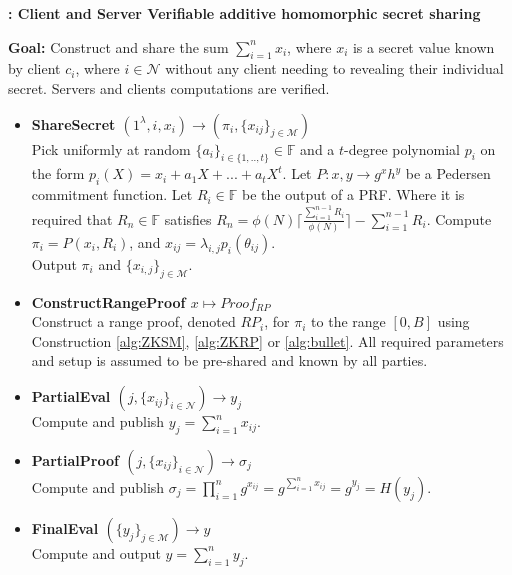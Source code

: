 \begin{algorithm}
\caption{\textbf{: Client and Server Verifiable additive homomorphic secret sharing}}

\textbf{Goal:} Construct and share the sum $\sum_{i=1}^n x_i$, where $x_i$ is a secret value known by client $c_i$, where $i\in\mathcal{N}$ without any client needing to revealing their individual secret. Servers and clients computations are verified. 
\vspace{2pt}
\hline
\vspace{2pt}
\begin{itemize}
  \item\textbf{ShareSecret $(1^\lambda,i,x_i)\xrightarrow[]{}(\pi_i,\{x_{ij}\}_{j\in\mathcal{M}})$}\\
Pick uniformly at random $\{a_i\}_{i\in\{1,..,t\}}\in\mathds{F}$ and a $t$-degree polynomial $p_i$ on the form $p_i(X) = x_i + a_1X+...+a_tX^t$.
Let $P : x,y \to g^xh^y$ be a Pedersen commitment function.
 Let $R_i\in\mathds{F}$ be the output of a PRF. Where it is required that  $R_n\in \mathds{F}$  satisfies
$R_n = \phi(N)\lceil \frac{\sum_{i=1}^{n-1}R_i}{\phi(N)}\rceil- \sum_{i=1}^{n-1}R_i $. Compute $\pi_i = P(x_i,R_i)$, and $x_{ij}=\lambda_{i,j}p_i(\theta_{ij})$. \\
Output $\pi_i$ and $\{x_{i,j}\}_{j\in\mathcal{M}}$.
\item\textbf{ConstructRangeProof $x \mapsto Proof_{RP}$}\\
Construct a range proof, denoted $RP_i$, for  $\pi_i$ to the  range $[0,B]$ using Construction \ref{alg:ZKSM}, \ref{alg:ZKRP} or \ref{alg:bullet}. All required  parameters and setup is assumed to be pre-shared and known by all parties.
\item\textbf{PartialEval $(j,\{x_{ij}\}_{i\in\mathcal{N}})\xrightarrow[]{}y_j$}\\
Compute and publish $y_j = \sum_{i=1}^n x_{ij}$.

\item\textbf{PartialProof $(j,\{x_{ij}\}_{i\in\mathcal{N}})\xrightarrow[]{}\sigma_j$}\\
Compute and publish $\sigma_j = \prod_{i=1}^n g^{x_{ij}} =  g^{\sum_{i=1}^n x_{ij}}= g^{y_j}=H(y_j)$.

\item\textbf{FinalEval $(\{y_j\}_{j\in\mathcal{M}})\xrightarrow[]{}y$}\\
Compute and output $y = \sum_{i=1}^n y_{j}$.


\end{itemize}
\end{algorithm}
